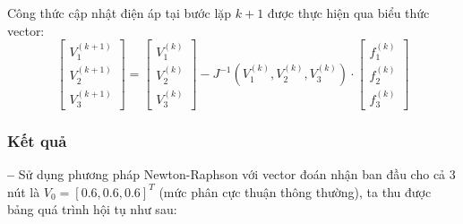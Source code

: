  Công thức cập nhật điện áp tại bước lặp $k+1$ được thực hiện qua biểu thức vector:
\begin{equation}
\begin{bmatrix} V_1^{(k+1)} \\ V_2^{(k+1)} \\ V_3^{(k+1)} \end{bmatrix} = \begin{bmatrix} V_1^{(k)} \\ V_2^{(k)} \\ V_3^{(k)} \end{bmatrix} - J^{-1}(V_1^{(k)}, V_2^{(k)}, V_3^{(k)}) \cdot \begin{bmatrix} f_1^{(k)} \\ f_2^{(k)} \\ f_3^{(k)} \end{bmatrix}
\end{equation}
\subsubsection*{Kết quả}
\noindent \textbf{--} Sử dụng phương pháp Newton-Raphson với vector đoán nhận ban đầu cho cả 3 nút là $V_0 = [0.6, 0.6, 0.6]^T$ (mức phân cực thuận thông thường), ta thu được bảng quá trình hội tụ như sau:

